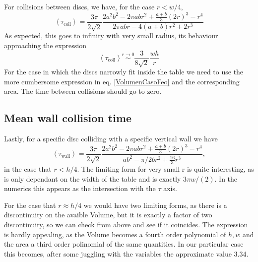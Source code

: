 \documentclass[superscriptaddress,pre,reprint,showpacs,onecolumn]{revtex4-1}
\newcommand{\mean}[1]{\left \langle #1 \right \rangle}
\begin{document}
For collisions between discs, we have, for the case $r<w/4$,
\begin{equation}\label{colltau}
 \mean{\tau_\text{coll}} = 	
\frac{3 \pi}{2\sqrt{2}}
\frac {2 a^{2} b^{2}  - 2 \pi a b r^{2} + \textstyle \frac{a+b}{3}  (2r)^{3}  -  r^4}
{2\pi a b r -4(a+b)r^2+2r^3}
\end{equation}
As expected, this goes to infinity with very small radius, its behaviour
approaching the expression
\begin{equation}\label{colltaulim0}
\mean{\tau_\text{coll}} \overset{r \to 0}{\sim}
\frac{3}{8\sqrt{2}}\frac{wh}{r}
\end{equation}
For the case in which the discs narrowly fit inside the table we need to
use the more cumbersome expression in eq. \ref{VolumenCasoFeo} and
the corresponding area. The time between collisions should go to zero.


\subsection{Mean wall collision time}

Lastly, for a specific disc colliding with a specific vertical wall we have
\begin{equation}\label{impactwall}
 \mean{\tau_\text{wall}} = 	
\frac{3 \pi}{2\sqrt{2}}
\frac { 2a^{2} b^{2}  -  2\pi a b r^{2} + \frac{a+b}{3}(2r)^3 - r^4}
{ab^2-\pi/2b r^2 + \frac{16}{3} r^3 },
\end{equation}
in the case that $r<h/4$. The limiting form for very small r is
quite interesting, as is only dependant on the width of the table and is exactly
$3\pi w/(2)$. In the numerics this appears as the intersection with the $\tau$
axis.

For the case that $r\approx h/4$ we would have two limiting forms,
as there is a discontinuity on the avaible Volume, but it is exactly
a factor of two discontinuity, so we can check from above and see
if it coincides. The expression is hardly appealing, as the Volume becomes
a fourth order polynomial of $h,w$ and the area a third order polinomial of
the same quantities. In our particular case this becomes,
after some juggling with the variables the approximate value 3.34. 


\end{document}
